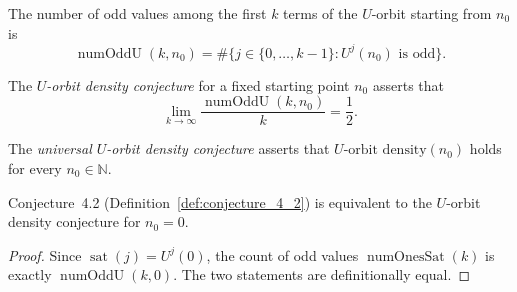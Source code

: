 
\begin{definition}\label{def:numOddU}\leanok
The number of odd values among the first $k$ terms of the $U$-orbit starting
from $n_0$ is
\[
  \operatorname{numOddU}(k, n_0)
  = \#\bigl\{j \in \{0, \ldots, k-1\} : U^j(n_0) \text{ is odd}\bigr\}.
\]
\end{definition}

\begin{definition}\label{def:U_orbit_density}\leanok
The \emph{$U$-orbit density conjecture} for a fixed starting point $n_0$
asserts that
\[
  \lim_{k \to \infty} \frac{\operatorname{numOddU}(k, n_0)}{k}
  = \frac{1}{2}.
\]
\end{definition}

\begin{definition}\label{def:conjecture_U_orbit_density}\leanok
The \emph{universal $U$-orbit density conjecture} asserts that
$U\text{-orbit density}(n_0)$ holds for every $n_0 \in \mathbb{N}$.
\end{definition}

\begin{lemma}\label{lemma:conjecture_4_2_eq_U_orbit_zero}\leanok
Conjecture~4.2 (Definition~\ref{def:conjecture_4_2}) is equivalent to the
$U$-orbit density conjecture for $n_0 = 0$.
\end{lemma}
\begin{proof}\leanok
Since $\operatorname{sat}(j) = U^j(0)$, the count of odd values
$\operatorname{numOnesSat}(k)$ is exactly $\operatorname{numOddU}(k, 0)$.
The two statements are definitionally equal.
\end{proof}
